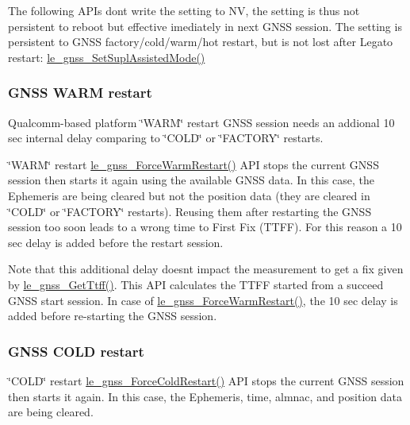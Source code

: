 The following A\+P\+Is don\textquotesingle{}t write the setting to NV, the setting is thus not persistent to reboot but effective imediately in next G\+N\+SS session. The setting is persistent to G\+N\+SS factory/cold/warm/hot restart, but is not lost after Legato restart\+: \hyperlink{le__gnss__interface_8h_a5d74c2ad91a504a1d0ac35b4f4f2c382}{le\+\_\+gnss\+\_\+\+Set\+Supl\+Assisted\+Mode()}\hypertarget{platformConstraintsGnss_platformConstraintsGnss_WarmRestart}{}\subsubsection{G\+N\+S\+S W\+A\+R\+M restart}\label{platformConstraintsGnss_platformConstraintsGnss_WarmRestart}
Qualcomm-\/based platform \char`\"{}\+W\+A\+R\+M\char`\"{} restart G\+N\+SS session needs an addional 10 sec internal delay comparing to \char`\"{}\+C\+O\+L\+D\char`\"{} or \char`\"{}\+F\+A\+C\+T\+O\+R\+Y\char`\"{} restarts.

\char`\"{}\+W\+A\+R\+M\char`\"{} restart \hyperlink{le__gnss__interface_8h_a1f5b3008db50d34c7962fb73c306f3d1}{le\+\_\+gnss\+\_\+\+Force\+Warm\+Restart()} A\+PI stops the current G\+N\+SS session then starts it again using the available G\+N\+SS data. In this case, the Ephemeris are being cleared but not the position data (they are cleared in \char`\"{}\+C\+O\+L\+D\char`\"{} or \char`\"{}\+F\+A\+C\+T\+O\+R\+Y\char`\"{} restarts). Reusing them after restarting the G\+N\+SS session too soon leads to a wrong time to First Fix (T\+T\+FF). For this reason a 10 sec delay is added before the restart session.

Note that this additional delay doesn\textquotesingle{}t impact the measurement to get a fix given by \hyperlink{le__gnss__interface_8h_a6b2fbb3902c9fd3336b5940b2abacb12}{le\+\_\+gnss\+\_\+\+Get\+Ttff()}. This A\+PI calculates the T\+T\+FF started from a succeed G\+N\+SS start session. In case of \hyperlink{le__gnss__interface_8h_a1f5b3008db50d34c7962fb73c306f3d1}{le\+\_\+gnss\+\_\+\+Force\+Warm\+Restart()}, the 10 sec delay is added before re-\/starting the G\+N\+SS session.\hypertarget{platformConstraintsGnss_platformConstraintsGnss_ColdRestart}{}\subsubsection{G\+N\+S\+S C\+O\+L\+D restart}\label{platformConstraintsGnss_platformConstraintsGnss_ColdRestart}
\char`\"{}\+C\+O\+L\+D\char`\"{} restart \hyperlink{le__gnss__interface_8h_aa702703bbeebbefd65dd51b1f9fd4ce5}{le\+\_\+gnss\+\_\+\+Force\+Cold\+Restart()} A\+PI stops the current G\+N\+SS session then starts it again. In this case, the Ephemeris, time, almnac, and position data are being cleared.

